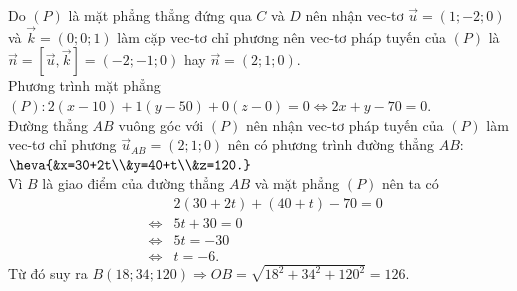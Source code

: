\begin{bt}
{		Do $(P)$ là mặt phẳng thẳng đứng qua $C$ và $D$ nên nhận vec-tơ $\overrightarrow{u}=(1;-2;0)$ và $\overrightarrow{k}=(0;0;1)$ làm cặp vec-tơ chỉ phương nên vec-tơ pháp  tuyến của $(P)$ là $\overrightarrow{n}=\left[\overrightarrow{u},\overrightarrow{k}\right]=(-2;-1;0)$ hay $\overrightarrow{n}=(2;1;0)$.\\
		Phương trình mặt phẳng  $(P) \colon 2(x-10)+1(y-50)+0(z-0)=0 \Leftrightarrow 2x+y-70=0$.\\
		Đường thẳng $AB$  vuông góc với $(P)$ nên nhận vec-tơ pháp tuyến của $(P)$ làm vec-tơ chỉ phương $\overrightarrow{u}_{AB}=(2;1;0)$ nên có phương trình đường thẳng $AB \colon$ $\heva{&x=30+2t\\&y=40+t\\&z=120.}$\\
		Vì $B$ là giao điểm của đường thẳng $AB$ và mặt phẳng  $(P)$ nên ta có
		\allowdisplaybreaks 
		\begin{eqnarray*}
			&&2(30+2t)+(40+t)-70=0\\ 
			&\Leftrightarrow&5t+30=0 \\ 
			&\Leftrightarrow&5t=-30 \\ 
			 &\Leftrightarrow&t=-6.
		\end{eqnarray*}
		Từ đó suy ra  $B(18;34;120) \Rightarrow OB=\sqrt{18^2+34^2+120^2}=126$.
	 }
\end{bt}

